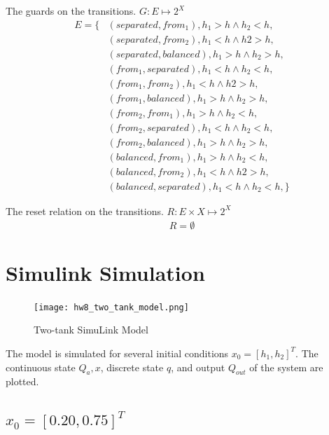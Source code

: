 \documentclass{article}
\begin{document}
The guards on the transitions.
$G: E \mapsto 2^X$
\begin{align}
E = \{
  & ( separated, from_1 ), h_1 > h \wedge h_2 < h, \\
  & ( separated, from_2 ), h_1 < h \wedge h2 > h, \\
  & ( separated, balanced ), h_1 > h \wedge h_2 > h, \\
  & ( from_1, separated ), h_1 < h \wedge h_2 < h, \\
  & ( from_1, from_2 ), h_1 < h \wedge h2 > h, \\
  & ( from_1, balanced ), h_1 > h \wedge h_2 > h,  \\
  & ( from_2, from_1 ), h_1 > h \wedge h_2 < h, \\
  & ( from_2, separated ), h_1 < h \wedge h_2 < h, \\
  & ( from_2, balanced ), h_1 > h \wedge h_2 > h,  \\
  & ( balanced, from_1 ), h_1 > h \wedge h_2 < h, \\
  & ( balanced, from_2 ), h_1 < h \wedge h2 > h, \\
  & ( balanced, separated ), h_1 < h \wedge h_2 < h,  \}
\end{align}

The reset relation on the transitions.
$R: E \times X \mapsto 2^X$
\begin{align}
R = \emptyset
\end{align}

\section{Simulink Simulation}

\begin{figure}[h!]
\centering
\texttt{[image: hw8\_two\_tank\_model.png]}
\caption{Two-tank SimuLink Model}
\label{fig:two-tank-model}
\end{figure}

The model is simulated for several initial conditions $x_0 = [h_1, h_2]^T$.
The continuous state $Q_{a}, x$, discrete state $q$, and
output $Q_{out}$ of the system are plotted.

\subsection{$x_0 = [0.20, 0.75]^T$}
\end{document}
